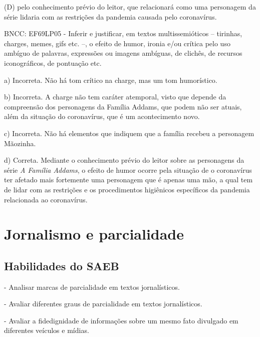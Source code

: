 \begin{itemize}
\begin{itemize}
(D) pelo conhecimento prévio do leitor, que relacionará como uma
personagem da série lidaria com as restrições da pandemia causada pelo
coronavírus.

BNCC: EF69LP05 - Inferir e justificar, em textos multissemióticos --
tirinhas, charges, memes, gifs etc. --, o efeito de humor, ironia e/ou
crítica pelo uso ambíguo de palavras, expressões ou imagens ambíguas, de
clichês, de recursos iconográficos, de pontuação etc.

a) Incorreta. Não há tom crítico na charge, mas um tom humorístico.

b) Incorreta. A charge não tem caráter atemporal, visto que depende da
compreensão dos personagens da Família Addams, que podem não ser atuais,
além da situação do coronavírus, que é um acontecimento novo.

c) Incorreta. Não há elementos que indiquem que a família recebeu a
personagem Mãozinha.

d) Correta. Mediante o conhecimento prévio do leitor sobre as
personagens da série \emph{A Família Addams}, o efeito de humor ocorre
pela situação de o coronavírus ter afetado mais fortemente uma
personagem que é apenas uma mão, a qual tem de lidar com as restrições e
os procedimentos higiênicos específicos da pandemia relacionada ao
coronavírus.

\chapter{Jornalismo e parcialidade}

\section{Habilidades do SAEB}

- Analisar marcas de parcialidade em textos jornalísticos.

- Avaliar diferentes graus de parcialidade em textos jornalísticos.

- Avaliar a fidedignidade de informações sobre um mesmo fato divulgado
em diferentes veículos e mídias.

\end{itemize}
\end{itemize}
